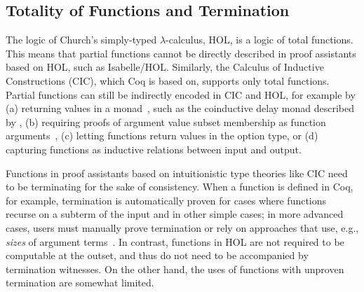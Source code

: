 %
%

\subsection{Totality of Functions and Termination}
\label{sec:totality-termination}
The logic of Church's simply-typed $\lambda$-calculus, HOL, is a logic of total functions. This means that partial functions cannot be directly described in proof assistants based on HOL, such as Isabelle/HOL. Similarly, the Calculus of Inductive Constructions (CIC), which Coq is based on, supports only total functions. Partial functions can still be indirectly encoded in CIC and HOL, for example by (a) returning values in a monad~\citep{McBride2015}, such as the coinductive delay monad described by \cite{Capretta2005}, (b) requiring proofs of argument value subset membership as function arguments~\citep{CoqArt}, (c) letting functions return values in the option type, or (d) capturing functions as inductive relations between input and output.

Functions in proof assistants based on intuitionistic type theories like CIC need to be terminating for the sake of consistency. When a function is defined in Coq, for example, termination is automatically proven for cases where functions recurse on a subterm of the input and in other simple cases; in more advanced cases, users must manually prove termination or rely on approaches that use, e.g., \emph{sizes} of argument terms~\citep{Abel2017}. In contrast, functions in HOL are not required to be computable at the outset, and thus do not need to be accompanied by termination witnesses. On the other hand, the uses of functions with unproven termination are somewhat limited.

